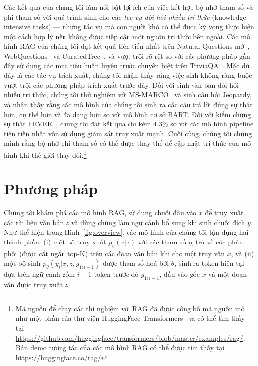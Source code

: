 \documentclass[10pt,letterpaper]{article}
\newcounter{tnote}
\begin{document}
Các kết quả của chúng tôi làm nổi bật lợi ích của việc kết hợp bộ nhớ tham số
và phi tham số với quá trình sinh cho các \emph{tác vụ đòi hỏi nhiều tri thức}
(knowledge-intensive tasks) --- những tác vụ mà con người khó có thể được kỳ
vọng thực hiện một cách hợp lý nếu không được tiếp cận một nguồn tri thức bên
ngoài. Các mô hình RAG của chúng tôi đạt kết quả tiên tiến nhất trên Natural
Questions mở~\cite{b29}, WebQuestions~\cite{b3} và CuratedTrec~\cite{b2}, và
vượt trội rõ rệt so với các phương pháp gần đây sử dụng các mục tiêu huấn luyện
trước chuyên biệt trên TriviaQA~\cite{b24}. Mặc dù đây là các tác vụ trích
xuất, chúng tôi nhận thấy rằng việc sinh không ràng buộc vượt trội các phương
pháp trích xuất trước đây. Đối với sinh văn bản đòi hỏi nhiều tri thức, chúng
tôi thử nghiệm với MS-MARCO~\cite{b1} và sinh câu hỏi Jeopardy, và nhận thấy
rằng các mô hình của chúng tôi sinh ra các câu trả lời đúng sự thật hơn, cụ thể
hơn và đa dạng hơn so với mô hình cơ sở BART. Đối với kiểm chứng sự thật
FEVER~\cite{b56}, chúng tôi đạt kết quả chỉ kém 4.3\% so với các mô hình
pipeline tiên tiến nhất vốn sử dụng giám sát truy xuất mạnh. Cuối cùng, chúng
tôi chứng minh rằng bộ nhớ phi tham số có thể được thay thế để cập nhật tri
thức của mô hình khi thế giới thay đổi.\footnote{Mã nguồn để chạy các thí
nghiệm với RAG đã được công bố mã nguồn mở như một phần của thư viện
HuggingFace Transformers~\cite{b66} và có thể tìm thấy tại
\url{https://github.com/huggingface/transformers/blob/master/examples/rag/}.
Bản demo tương tác của các mô hình RAG có thể được tìm thấy tại
\url{https://huggingface.co/rag/}}

\section{Phương pháp}
Chúng tôi khám phá các mô hình RAG, sử dụng chuỗi đầu vào $x$ để truy xuất các
tài liệu văn bản $z$ và dùng chúng làm ngữ cảnh bổ sung khi sinh chuỗi đích
$y$. Như thể hiện trong Hình~\ref{fig:overview}, các mô hình của chúng tôi tận
dụng hai thành phần: (i) một bộ truy xuất $p_\eta(z|x)$ với các tham số $\eta$,
trả về các phân phối (được cắt ngắn top-K) trên các đoạn văn bản khi cho một
truy vấn $x$, và (ii) một bộ sinh $p_\theta(y_i|x,z,y_{1:i-1})$ được tham số
hoá bởi $\theta$, sinh ra token hiện tại dựa trên ngữ cảnh gồm $i-1$ token
trước đó $y_{1:i-1}$, đầu vào gốc $x$ và một đoạn văn được truy xuất $z$.
\end{document}
